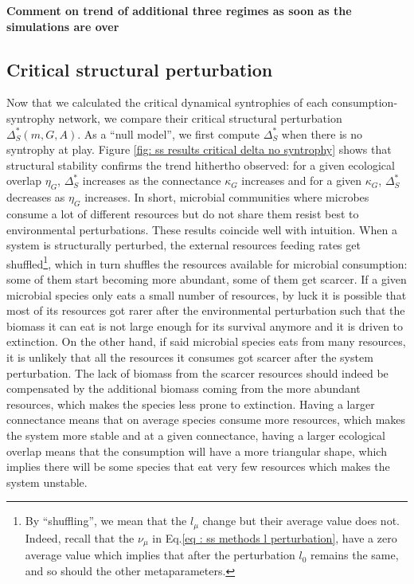 \documentclass[12pt, titlepage]{report}
\begin{document}
\textbf{Comment on trend of additional three regimes as soon as the simulations are over}

\subsection{Critical structural perturbation}
Now that we calculated the critical dynamical syntrophies of each consumption-syntrophy network, we compare their critical structural perturbation $\Delta_S^*(m, G, A)$. As a ``null model'', we first compute $\Delta_S^*$ when there is no syntrophy at play. Figure \ref{fig: ss results critical delta no syntrophy} shows that structural stability confirms the trend hithertho observed: for a given ecological overlap $\eta_G$, $\Delta_S^*$ increases as the connectance $\kappa_G$ increases and for a given $\kappa_G$, $\Delta_S^*$ decreases as $\eta_G$ increases. In short, microbial communities where microbes consume a lot of different resources but do not share them resist best to environmental perturbations. These results coincide well with intuition.
When a system is structurally perturbed, the external resources feeding rates get shuffled\footnote{By ``shuffling'', we mean that the $l_\mu$ change but their average value does not. Indeed, recall that the $\nu_\mu$ in Eq.\eqref{eq : ss methods l perturbation}, have a zero average value which implies that after the perturbation $l_0$ remains the same, and so should the other metaparameters.}, which in turn shuffles the resources available for microbial consumption: some of them start becoming more abundant, some of them get scarcer. If a given microbial species only eats a small number of resources, by luck it is possible that most of its resources got rarer after the environmental perturbation such that the biomass it can eat is not large enough for its survival anymore and it is driven to extinction. On the other hand, if said microbial species eats from many resources, it is unlikely that all the resources it consumes got scarcer after the system perturbation. The lack of biomass from the scarcer resources should indeed be compensated by the additional biomass coming from the more abundant resources, which makes the species less prone to extinction. Having a larger connectance means that on average species consume more resources, which makes the system more stable and at a given connectance, having a larger ecological overlap means that the consumption will have a more triangular shape, which implies there will be some species that eat very few resources which makes the system unstable.
\end{document}
